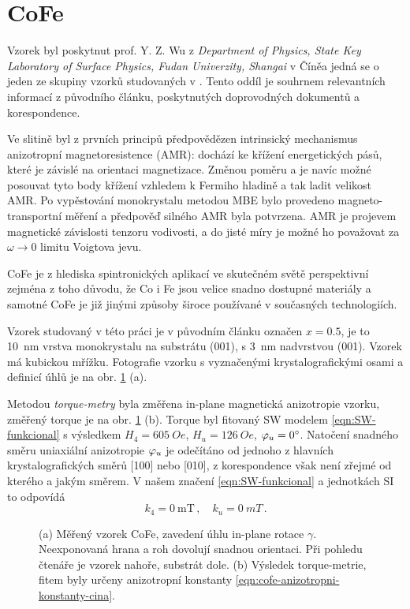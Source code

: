 \section{CoFe}
\label{chap:vzorek-cofe}

Vzorek byl poskytnut prof. Y. Z. Wu z \emph{Department of Physics, State Key Laboratory of Surface Physics, Fudan Univerzity, Shangai} v Číněa jedná se o jeden ze skupiny vzorků studovaných v \cite{zengIntrinsicMechanismAnisotropic2020}.
Tento oddíl je souhrnem relevantních informací z původního článku, poskytnutých doprovodných dokumentů a korespondence.

Ve slitině  byl z prvních principů předpovědězen intrinsický mechanismus anizotropní magnetoresistence (AMR): dochází ke křížení energetických pásů, které je závislé na orientaci magnetizace.
Změnou poměru  a  je navíc možné posouvat tyto body křížení vzhledem k Fermiho hladině a tak ladit velikost AMR.
Po vypěstování monokrystalu metodou MBE bylo provedeno magneto-transportní měření a předpověď silného AMR byla potvrzena.
AMR je projevem magnetické závislosti tenzoru vodivosti, a do jisté míry je možné ho považovat za $\omega\to 0$ limitu Voigtova jevu.

CoFe je z hlediska spintronických aplikací ve skutečném světě perspektivní zejména z toho důvodu, že Co i Fe jsou velice snadno dostupné materiály a samotné CoFe je již jinými způsoby široce používané v současných technologiích.

Vzorek studovaný v této práci je v původním článku označen $x=0.5$, je to \SI{10}{\nano\meter} vrstva monokrystalu  na substrátu (001), s \SI{3}{\nano\meter} nadvrstvou (001).
Vzorek má kubickou mřížku.
Fotografie vzorku s vyznačenými krystalografickými osami a definicí úhlů je na obr. \ref{fig:vzorek-cofe} (a).

Metodou \emph{torque-metry} byla změřena in-plane magnetická anizotropie vzorku, změřený torque je na obr. \ref{fig:vzorek-cofe} (b).
Torque byl fitovaný SW modelem \eqref{eqn:SW-funkcional} s výsledkem $H_4=\SI{605}{Oe}$, $H_u=\SI{126}{Oe}$, $\varphi_u=\SI{0}{\degree}$.
Natočení snadného směru uniaxiální anizotropie $\varphi_u$ je odečítáno od jednoho z hlavních krystalografických směrů [100] nebo [010], z korespondence však není zřejmé od kterého a jakým směrem.
V našem značení \eqref{eqn:SW-funkcional} a jednotkách SI to odpovídá
\begin{equation}
\label{eqn:cofe-anizotropni-konstanty-cina}
    k_4 = \SI{0}{\milli\tesla} \,,\quad k_u = \SI{0}{mT} \,.
\end{equation}

\begin{figure}[htbp]
    \centering
    
    \caption{(a) Měřený vzorek CoFe, zavedení úhlu in-plane rotace $\gamma$. Neexponovaná hrana a roh dovolují snadnou orientaci. Při pohledu čtenáře je vzorek nahoře, substrát dole. (b) Výsledek torque-metrie, fitem byly určeny anizotropní konstanty \eqref{eqn:cofe-anizotropni-konstanty-cina}\cite{zengIntrinsicMechanismAnisotropic2020}.}
    \label{fig:vzorek-cofe}
\end{figure}
